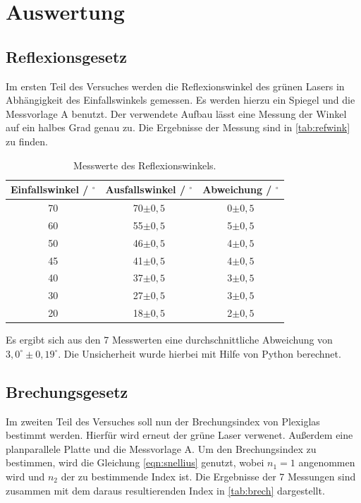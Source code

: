 \section{Auswertung}
\label{sec:Auswertung}

\subsection{Reflexionsgesetz}

Im ersten Teil des Versuches werden die Reflexionswinkel des grünen Lasers in Abhängigkeit des Einfallswinkels gemessen. Es werden hierzu ein Spiegel und die Messvorlage A
benutzt. Der verwendete Aufbau lässt eine Messung der Winkel auf ein halbes Grad genau zu. Die Ergebnisse der Messung sind in \autoref{tab:refwink} zu finden.

\begin{table}[H]
  \centering
  \caption{Messwerte des Reflexionswinkels.}
  \label{tab:refwink}
  \begin{tabular}{c c c}
    \toprule
    Einfallswinkel / $^{\circ}$ & Ausfallswinkel / $^{\circ}$ & Abweichung / $^{\circ}$\\
    \midrule
    70 & 70$\pm 0,5$ & 0$\pm 0,5$\\
    60 & 55$\pm 0,5$ & 5$\pm 0,5$\\
    50 & 46$\pm 0,5$ & 4$\pm 0,5$\\
    45 & 41$\pm 0,5$ & 4$\pm 0,5$\\
    40 & 37$\pm 0,5$ & 3$\pm 0,5$\\
    30 & 27$\pm 0,5$ & 3$\pm 0,5$\\
    20 & 18$\pm 0,5$ & 2$\pm 0,5$\\
    \bottomrule
  \end{tabular}
\end{table}

\noindent
Es ergibt sich aus den 7 Messwerten eine durchschnittliche Abweichung von $3,0^{\circ}\pm 0,19^{\circ}$. Die Unsicherheit wurde hierbei mit Hilfe von Python berechnet.

\subsection{Brechungsgesetz}

Im zweiten Teil des Versuches soll nun der Brechungsindex von Plexiglas bestimmt werden. Hierfür wird erneut der grüne Laser verwenet. Außerdem eine planparallele
Platte und die Messvorlage A. Um den Brechungsindex zu bestimmen, wird die Gleichung \eqref{eqn:snellius} genutzt, wobei $n_1 = 1$ angenommen wird und $n_2$ der
zu bestimmende Index ist. Die Ergebnisse der 7 Messungen sind zusammen mit dem daraus resultierenden Index in \autoref{tab:brech} dargestellt.

